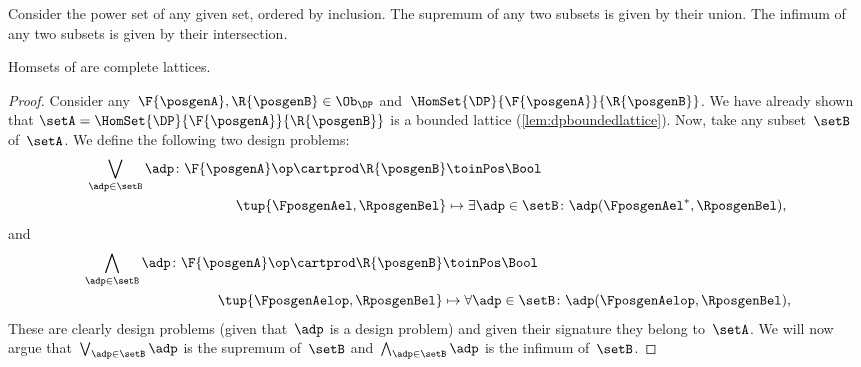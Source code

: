 \begin{example}
	Consider the power set of any given set, ordered by inclusion.
	The supremum of any two subsets is given by their union.
	The infimum of any two subsets is given by their intersection.
\end{example}

\begin{lemma}
	\label{lem:DP-homsets-complete-lattice}
	Homsets of \DP are complete lattices.
\end{lemma}

\begin{proof}
	Consider any~$\F{\posgenA},\R{\posgenB}\in \Ob_\DP$ and~$\HomSet{\DP}{\F{\posgenA}}{\R{\posgenB}}$.
	We have already shown that $\setA=\HomSet{\DP}{\F{\posgenA}}{\R{\posgenB}}$ is a bounded lattice (\cref{lem:dpboundedlattice}).
	Now, take any subset~$\setB$ of~$\setA$.
	We define the following two design problems:
	\begin{equation*}
		\begin{aligned}
			\bigvee_{\adp \in \setB} \adp\colon \F{\posgenA}\op \cartprod \R{\posgenB} & \toinPos \Bool                                                       \\
			\tup{\FposgenAel,\RposgenBel}                                              & \mapsto \exists \adp\in \setB\colon \adp(\FposgenAel^*,\RposgenBel),
		\end{aligned}
	\end{equation*}
	and
	\begin{equation*}
		\begin{aligned}
			\bigwedge_{\adp \in \setB} \adp\colon \F{\posgenA}\op \cartprod \R{\posgenB} & \toinPos \Bool                                                       \\
			\tup{\FposgenAelop,\RposgenBel}                                              & \mapsto \forall \adp\in \setB\colon \adp(\FposgenAelop,\RposgenBel),
		\end{aligned}
	\end{equation*}
	These are clearly design problems (given that~$\adp$ is a design problem) and given their signature they belong to~$\setA$.
	We will now argue that~$\bigvee_{\adp \in \setB} \adp$ is the supremum of~$\setB$ and~$\bigwedge_{\adp \in \setB} \adp$ is the infimum of~$\setB$.

\end{proof}
